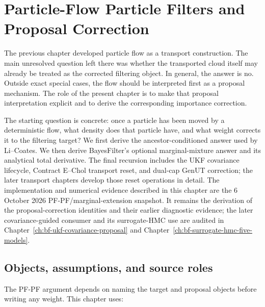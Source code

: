 \chapter{Particle-Flow Particle Filters and Proposal Correction}
\label{ch:bf-dpf-pfpf}

The previous chapter developed particle flow as a transport construction.  The
main unresolved question left there was whether the transported cloud itself may
already be treated as the corrected filtering object.  In general, the answer is
no.  Outside exact special cases, the flow should be interpreted first as a
proposal mechanism.  The role of the present chapter is to make that proposal
interpretation explicit and to derive the corresponding importance correction.

The starting question is concrete: once a particle has been moved by a
deterministic flow, what density does that particle have, and what weight
corrects it to the filtering target? We first derive the ancestor-conditioned
answer used by Li--Coates. We then derive BayesFilter's optional marginal-mixture
answer and its analytical total derivative. The final recursion includes the
UKF covariance lifecycle, Contract E--Chol transport reset, and dual-cap GenUT
correction; the later transport chapters develop those reset operations in
detail. The implementation and numerical evidence described in this chapter are the
6 October 2026 PF-PF/marginal-extension snapshot.  It remains the derivation
of the proposal-correction identities and their earlier diagnostic evidence;
the later covariance-guided consumer and its surrogate-HMC use are audited in
Chapter~\ref{ch:bf-ukf-covariance-proposal} and
Chapter~\ref{ch:bf-surrogate-hmc-five-models}.

\section{Objects, assumptions, and source roles}
\label{sec:bf-pfpf-objects}

The PF-PF argument depends on naming the target and proposal objects before
writing any weight.  This chapter uses:

